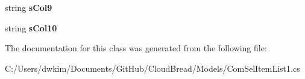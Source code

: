 \begin{DoxyCompactItemize}
\item 
string {\bfseries s\+Col9}\hypertarget{a00057_aed270e5d0c823ff12c009447f255750a}{}\label{a00057_aed270e5d0c823ff12c009447f255750a}

\item 
string {\bfseries s\+Col10}\hypertarget{a00057_a8baf12769fd356f4394b322b9f5b0075}{}\label{a00057_a8baf12769fd356f4394b322b9f5b0075}

\end{DoxyCompactItemize}


The documentation for this class was generated from the following file\+:\begin{DoxyCompactItemize}
\item 
C\+:/\+Users/dwkim/\+Documents/\+Git\+Hub/\+Cloud\+Bread/\+Models/Com\+Sel\+Item\+List1.\+cs\end{DoxyCompactItemize}
